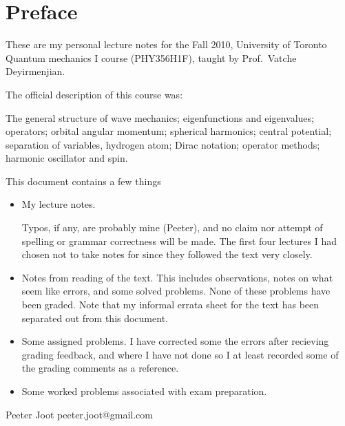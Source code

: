 %
%

% 
% 
\chapter*{Preface}%

These are my personal lecture notes for the Fall 2010, University of Toronto Quantum mechanics I course (PHY356H1F), taught by Prof.\ Vatche Deyirmenjian.

The official description of this course was:

The general structure of wave mechanics; eigenfunctions and eigenvalues; operators; orbital angular momentum; spherical harmonics; central potential; separation of variables, hydrogen atom; Dirac notation; operator methods; harmonic oscillator and spin.

This document contains a few things

\begin{itemize}
\item My lecture notes.

Typos, if any, are probably mine (Peeter), and no claim nor attempt of spelling or grammar correctness will be made.  The first four lectures I had chosen not to take notes for since they followed the text \citep{desai2009quantum} very closely.

\item Notes from reading of the text.  This includes observations, notes on what seem like errors, and some solved problems.  None of these problems have been graded.  Note that my informal errata sheet \citep{desaiTypos} for the text has been separated out from this document.

\item Some assigned problems.  I have corrected some the errors after recieving grading feedback, and where I have not done so I at least recorded some of the grading comments as a reference.

\item Some worked problems associated with exam preparation.

\end{itemize}

Peeter Joot  \quad peeter.joot@gmail.com 
